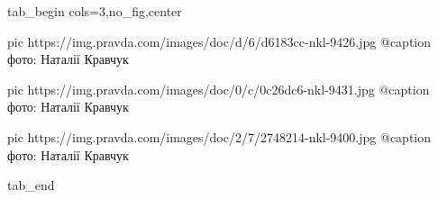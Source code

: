  
 
 
 
 


\ifcmt
  tab_begin cols=3,no_fig,center

     pic https://img.pravda.com/images/doc/d/6/d6183cc-nkl-9426.jpg
		 @caption фото: Наталії Кравчук

		 pic https://img.pravda.com/images/doc/0/c/0c26dc6-nkl-9431.jpg
		 @caption фото: Наталії Кравчук

		 pic https://img.pravda.com/images/doc/2/7/2748214-nkl-9400.jpg
		 @caption фото: Наталії Кравчук

  tab_end
\fi
